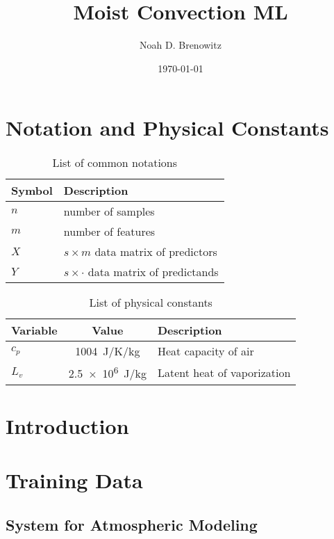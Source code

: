 \documentclass{report}
\title{Moist Convection ML}
\author{Noah D. Brenowitz}
\date{\today}
\begin{document}
\maketitle
\tableofcontents

\chapter*{Notation and Physical Constants}
\label{ch:notation}
\begin{table}
  \centering
  \begin{tabularx}{\textwidth}{lX}
    \toprule
    Symbol & Description\\
    \toprule
    $n$ & number of samples \\
    $m$ &  number of features\\
    $X$ & $s \times m$ data matrix of predictors\\
    $Y$ & $s \times \cdot $ data matrix of predictands\\
    \bottomrule
  \end{tabularx}
  
  \caption{List of common notations}
  \label{tab:constants}
\end{table}

\begin{table}
  \centering
  \begin{tabularx}{\textwidth}{lcX}
    \toprule
    Variable & Value & Description\\
    \toprule
    $c_p$ & \SI{1004}{J/K/kg} & Heat capacity of air\\
    $L_v$ & \SI{2.5e6}{J/kg} & Latent heat of vaporization\\
    \bottomrule
  \end{tabularx}
  
  \caption{List of physical constants}
  \label{tab:constants}
\end{table}
\chapter{Introduction}

\chapter{Training Data}

\section{System for Atmospheric Modeling}
\label{sec:sam}
\end{document}

